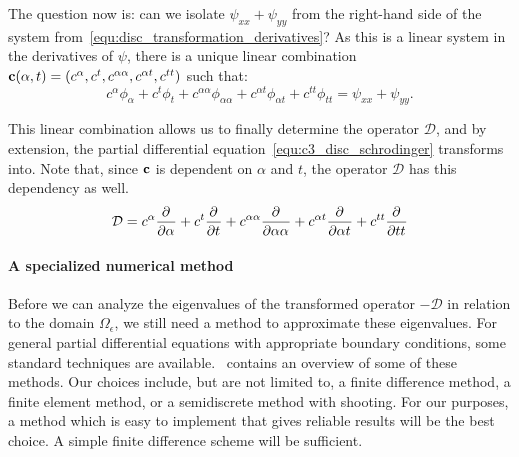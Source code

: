 The question now is: can we isolate $\psi_{xx} + \psi_{yy}$ from the right-hand side of the system from~\eqref{equ:disc_transformation_derivatives}? As this is a linear system in the derivatives of $\psi$, there is a unique linear combination $\vb{c}(\alpha, t) = (c^\alpha, c^t, c^{\alpha\alpha}, c^{\alpha t}, c^{tt})$ such that:
$$
  c^\alpha \phi_\alpha + c^t\phi_t + c^{\alpha\alpha}\phi_{\alpha\alpha} + c^{\alpha t} \phi_{\alpha t} + c^{tt} \phi_{tt} = \psi_{xx} + \psi_{yy}\text{.}
$$

This linear combination allows us to finally determine the operator $\mathcal{D}$, and by extension, the partial differential equation~\eqref{equ:c3_disc_schrodinger} transforms into. Note that, since $\vb{c}$ is dependent on $\alpha$ and $t$, the operator $\mathcal{D}$ has this dependency as well.
$$
  \mathcal{D} = c^\alpha {\pdv[]{}{\alpha}} + c^t \pdv[]{}{t} + c^{\alpha\alpha} \pdv[]{}{\alpha\alpha} + c^{\alpha t} \pdv[]{}{\alpha t} + c^{tt} \pdv[]{}{tt}
$$

\paragraph{A specialized numerical method}

Before we can analyze the eigenvalues of the transformed operator $-\mathcal{D}$ in relation to the domain $\Omega_\epsilon$, we still need a method to approximate these eigenvalues. For general partial differential equations with appropriate boundary conditions, some standard techniques are available.~\cite[Chapter~11]{heath_scientific_2002} contains an overview of some of these methods. Our choices include, but are not limited to, a finite difference method, a finite element method, or a semidiscrete method with shooting. For our purposes, a method which is easy to implement that gives reliable results will be the best choice. A simple finite difference scheme will be sufficient.

